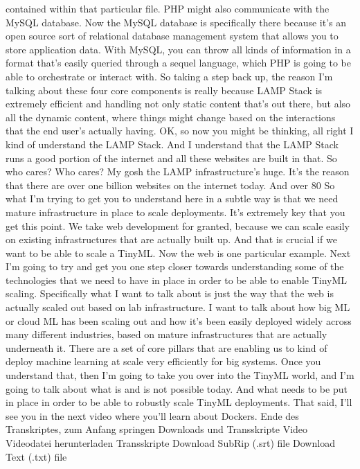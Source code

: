 {{{{{     contained within that particular file.
     PHP might also communicate with the MySQL database.
     Now the MySQL database is specifically there
     because it's an open source sort of relational database management system
     that allows you to store application data.
     With MySQL, you can throw all kinds of information
     in a format that's easily queried through a sequel language, which
     PHP is going to be able to orchestrate or interact with.
     So taking a step back up, the reason I'm talking about these four core
     components is really because LAMP Stack is extremely efficient and handling
     not only static content that's out there, but also all
     the dynamic content, where things might change based on the interactions
     that the end user's actually having.
     OK, so now you might be thinking, all right
     I kind of understand the LAMP Stack.
     And I understand that the LAMP Stack runs a good portion of the internet
     and all these websites are built in that.
     So who cares?
     Who cares?
     My gosh the LAMP infrastructure's huge.
     It's the reason that there are over one billion websites on the internet today.
     And over 80%
     So what I'm trying to get you to understand here in a subtle way
     is that we need mature infrastructure in place to scale deployments.
     It's extremely key that you get this point.
     We take web development for granted, because we
     can scale easily on existing infrastructures that are actually
     built up.
     And that is crucial if we want to be able to scale a TinyML.
     Now the web is one particular example.
     Next I'm going to try and get you one step closer towards understanding
     some of the technologies that we need to have in place
     in order to be able to enable TinyML scaling.
     Specifically what I want to talk about is
     just the way that the web is actually scaled out based on lab infrastructure.
     I want to talk about how big ML or cloud ML has been scaling out
     and how it's been easily deployed widely across many different industries,
     based on mature infrastructures that are actually underneath it.
     There are a set of core pillars that are enabling us
     to kind of deploy machine learning at scale very efficiently for big systems.
     Once you understand that, then I'm going to take you over into the TinyML world,
     and I'm going to talk about what is and is not possible today.
     And what needs to be put in place in order
     to be able to robustly scale TinyML deployments.
     That said, I'll see you in the next video where you'll learn about Dockers.
     Ende des Transkriptes, zum Anfang springen
     Downloads und Transskripte
     Video
     Videodatei herunterladen
     Transskripte
     Download SubRip (.srt) file
     Download Text (.txt) file
 
}}}}}

